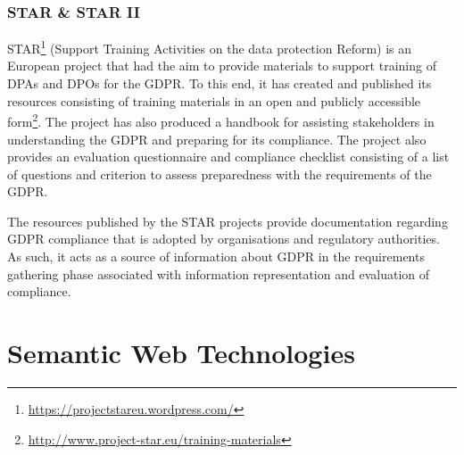 \subsubsection{STAR \& STAR II}
STAR\footnote{\url{https://projectstareu.wordpress.com/}} (Support Training Activities on the data protection Reform) is an European project that had the aim to provide materials to support training of DPAs and DPOs for the GDPR. To this end, it has created and published its resources consisting of training materials in an open and publicly accessible form\footnote{\url{http://www.project-star.eu/training-materials}}. The project has also produced a handbook for assisting stakeholders in understanding the GDPR and preparing for its compliance. The project also provides an evaluation questionnaire and compliance checklist \cite{noauthor_gdpr_2019-1}consisting of a list of questions and criterion to assess preparedness with the requirements of the GDPR. 

The resources published by the STAR projects provide documentation regarding GDPR compliance that is adopted by organisations and regulatory authorities. As such, it acts as a source of information about GDPR in the requirements gathering phase associated with information representation and evaluation of compliance.

\section{Semantic Web Technologies}\label{sec:background:semweb}

